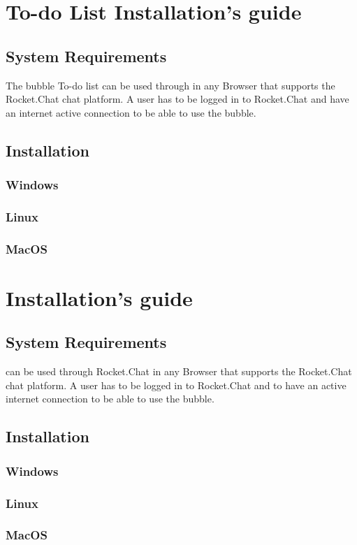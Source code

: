 \section{To-do List Installation's guide}

\subsection{System Requirements}
The bubble To-do list can be used through  in any Browser that supports the Rocket.Chat chat platform.
A user has to be logged in to Rocket.Chat and have an internet active connection to be able to use the bubble.

\subsection{Installation}

\subsubsection{Windows}

\subsubsection{Linux}

\subsubsection{MacOS}

\section{\DemoName{} Installation's guide}

\subsection{ \DemoName{} System Requirements}
\DemoName{} can be used through Rocket.Chat in any Browser that supports the Rocket.Chat chat platform.
A user has to be logged in to Rocket.Chat and to have an active internet connection to be able to use the bubble.

\subsection{Installation}

\subsubsection{Windows}

\subsubsection{Linux}

\subsubsection{MacOS}
